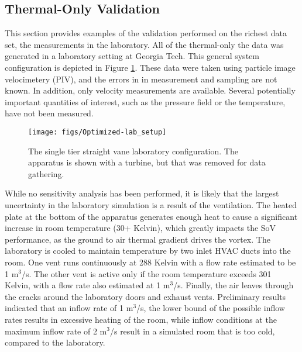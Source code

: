 %
%
\normalsize
\subsection{Thermal-Only Validation}
This section provides examples of the validation performed on the
richest data set, the measurements in the laboratory. All of the
thermal-only the data was generated in a laboratory setting at Georgia
Tech. This general system configuration is depicted in Figure
\ref{fig:lab_image}. These data were taken using particle image
velocimetery (PIV), and the errors in in measurement and sampling are
not known. In addition, only velocity measurements are
available. Several potentially important quantities of interest, such as
the pressure field or the temperature, have not been measured. 

%
%
 \begin{figure}[!htb]
   \begin{center}
    \texttt{[image: figs/Optimized-lab\_setup]}
    \caption{The single tier straight vane laboratory configuration. The
    apparatus is shown with a turbine, but that was removed for data
    gathering.}
    \label{fig:lab_image}
   \end{center}
 \end{figure}

While no sensitivity analysis has been performed, it is likely that the
largest uncertainty in the laboratory simulation is a result of the
ventilation. The heated plate at the bottom of the apparatus
generates enough heat to cause a significant increase in room
temperature (30+ Kelvin), which greatly impacts the SoV
performance, as the ground to air thermal gradient drives the
vortex. The laboratory is cooled to maintain
temperature by two inlet HVAC ducts into the room. 
One vent runs continuously at 288 Kelvin with a flow rate estimated 
to be 1 $\text{m}^3$/s.
The other vent is active only if the room temperature exceeds 301 Kelvin, 
with a flow rate also estimated at 1 $\text{m}^3$/s.
Finally, the air leaves through the cracks around the laboratory doors and 
exhaust vents. Preliminary results indicated that an inflow rate of 1
$\text{m}^3$/s, the lower bound of the possible inflow rates results in
excessive heating of the room, while inflow conditions at the maximum
inflow rate of 2 $\text{m}^3$/s result in a simulated room that is too cold,
compared to the laboratory.  

